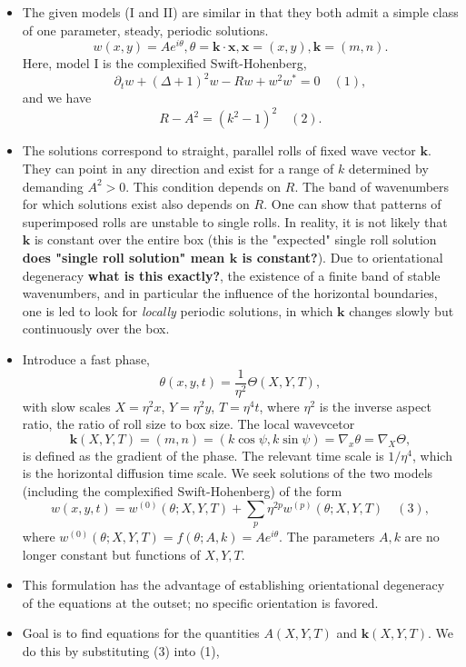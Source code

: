 \documentclass[12pt]{article}
\newcounter{solution}
\begin{document}
\begin{itemize}
    \item The given models (I and II) are similar in that they both admit a simple class of one parameter, steady, periodic solutions.
        \[
            w(x,y)=Ae^{i\theta}, \theta = \bm{k}\cdot \bm{x}, \bm{x}=(x,y), \bm{k}=(m,n).
        \] 
    Here, model I is the complexified Swift-Hohenberg,
    \[
        \partial_t w + (\Delta+1)^2w-Rw+w^2w^{*}=0 \quad (1),
    \] 
    and we have
    \[
        R-A^2 = (k^2-1)^2 \quad (2).
    \] 
    \item The solutions correspond to straight, parallel rolls of fixed wave vector $\bm{k}$. They can point in any direction and exist for a range of $k$ determined by demanding $A^2>0$. This condition depends on $R$. The band of wavenumbers for which solutions exist also depends on $R$. One can show that patterns of superimposed rolls are unstable to single rolls. In reality, it is not likely that $\bm{k}$ is constant over the entire box (this is the "expected" single roll solution \textbf{does "single roll solution" mean $\bm{k}$ is constant?}). Due to orientational degeneracy \textbf{what is this exactly?}, the existence of a finite band of stable wavenumbers, and in particular the influence of the horizontal boundaries, one is led to look for \emph{locally} periodic solutions, in which $\bm{k}$ changes slowly but continuously over the box. 
    \item Introduce a fast phase,
        \[
            \theta(x,y,t)=\frac{1}{\eta^2}\Theta(X,Y,T),
        \] 
        with slow scales $X=\eta^2 x$, $Y=\eta^2 y$, $T=\eta^4 t$, where $\eta^2$ is the inverse aspect ratio, the ratio of roll size to box size. The local wavevcetor
        \[
            \bm{k}(X,Y,T)=(m,n)=(k\cos\psi, k\sin\psi)=\nabla_x\theta = \nabla_X\Theta,
        \] 
        is defined as the gradient of the phase. The relevant time scale is $1/\eta^4$, which is the horizontal diffusion time scale. We seek solutions of the two models (including the complexified Swift-Hohenberg) of the form
        \[
            w(x,y,t) = w^{(0)}(\theta; X,Y,T)+\sum_{p}\eta^{2p}w^{(p)}(\theta;X,Y,T) \quad (3),
        \] 
        where $w^{(0)}(\theta;X,Y,T)=f(\theta;A,k)=Ae^{i\theta}$. The parameters $A,k$ are no longer constant but functions of $X,Y,T$.
    \item This formulation has the advantage of establishing orientational degeneracy of the equations at the outset; no specific orientation is favored.
    \item Goal is to find equations for the quantities $A(X,Y,T)$ and $\bm{k}(X,Y,T)$. We do this by substituting (3) into (1),
\end{itemize}
\end{document}
